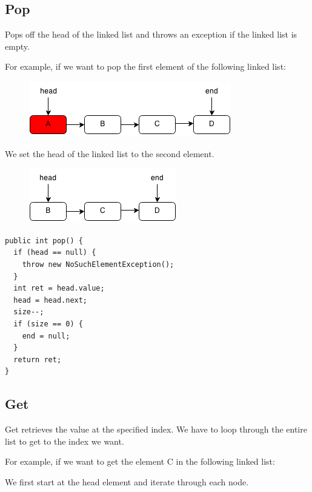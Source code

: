 \documentclass[11pt,oneside]{book}
\makeatletter
\def\maxwidth#1{\ifdim\Gin@nat@width>#1 #1\else\Gin@nat@width\fi}
\makeatother
\begin{document}
\subsection{Pop}

Pops off the head of the linked list and throws an exception if the linked list is empty.

For example, if we want to pop the first element of the following linked list:

\vspace{5px}\begin{figure}[H]\centering
        \includegraphics[width=0.66\maxwidth{\textwidth}]{linkedlistpop.png}
        \end{figure}

We set the head of the linked list to the second element.

\vspace{5px}\begin{figure}[H]\centering
        \includegraphics[width=0.66\maxwidth{\textwidth}]{linkedlistpop2.png}
        \end{figure}

\begin{lstlisting}
public int pop() {
  if (head == null) {
    throw new NoSuchElementException();
  }
  int ret = head.value;
  head = head.next;
  size--;
  if (size == 0) {
    end = null;
  }
  return ret;
}
\end{lstlisting}

\subsection{Get}

Get retrieves the value at the specified index. We have to loop through the entire list to get to the index we want.

For example, if we want to get the element C in the following linked list:

We first start at the head element and iterate through each node.
\end{document}
